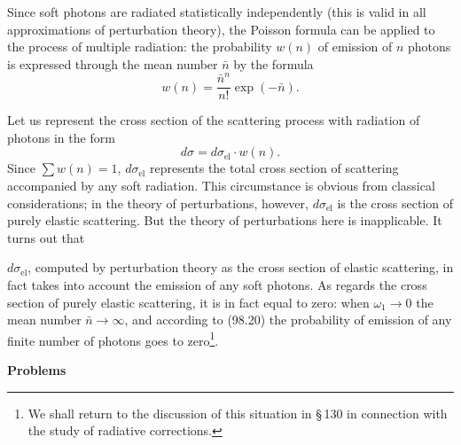 Since soft photons are radiated statistically independently (this is valid in all approximations of perturbation theory), the Poisson formula can be applied to the process of multiple radiation: the probability $w(n)$ of emission of $n$ photons is expressed through the mean number $\bar{n}$ by the formula
\begin{equation}
w(n) = \frac{\bar{n}^n}{n!}\exp(-\bar{n}).
\label{eq:98.20}
\end{equation}

Let us represent the cross section of the scattering process with radiation of photons in the form
\begin{equation}
d\sigma = d\sigma_\text{el}\cdot w(n).
\label{eq:98.21}
\end{equation}
Since $\sum w(n) = 1$, $d\sigma_\text{el}$ represents the total cross section of scattering accompanied by any soft radiation. This circumstance is obvious from classical considerations; in the theory of perturbations, however, $d\sigma_\text{el}$ is the cross section of purely elastic scattering. But the theory of perturbations here is inapplicable. It turns out that


$d\sigma_\text{el}$, computed by perturbation theory as the cross section of elastic scattering, in fact takes into account the emission of any soft photons. As regards the cross section of purely elastic scattering, it is in fact equal to zero: when $\omega_1 \to 0$ the mean number $\bar{n} \to \infty$, and according to (98.20) the probability of emission of any finite number of photons goes to zero\footnote{We shall return to the discussion of this situation in \S\,130 in connection with the study of radiative corrections.}.

\bigskip

\noindent\textbf{Problems}

